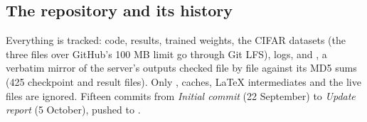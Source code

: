 \subsection{The repository and its history}
Everything is tracked: code, results, trained weights, the CIFAR datasets (the three files over GitHub's 100 MB limit go through Git LFS), logs, and , a verbatim mirror of the server's outputs checked file by file against its MD5 sums (425 checkpoint and result files). Only , caches, LaTeX intermediates and the live  files are ignored.
Fifteen commits from \emph{Initial commit} (22 September) to \emph{Update report} (5 October), pushed to .
